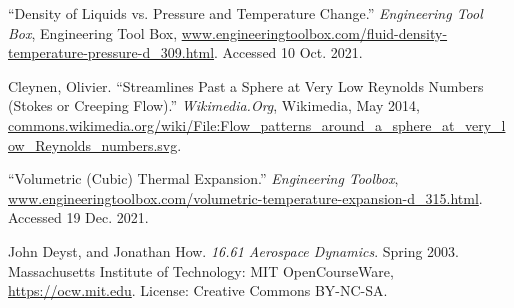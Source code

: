 
\begin{thebibliography}{12}


“Density of Liquids vs. Pressure and Temperature Change.” \emph{Engineering Tool Box}, Engineering Tool Box, \url{www.engineeringtoolbox.com/fluid-density-temperature-pressure-d_309.html}. Accessed 10 Oct. 2021.


Cleynen, Olivier. “Streamlines Past a Sphere at Very Low Reynolds Numbers (Stokes or Creeping Flow).” \emph{Wikimedia.Org}, Wikimedia, May 2014, \url{commons.wikimedia.org/wiki/File:Flow_patterns_around_a_sphere_at_very_low_Reynolds_numbers.svg}.


“Volumetric (Cubic) Thermal Expansion.” \emph{Engineering Toolbox}, \url{www.engineeringtoolbox.com/volumetric-temperature-expansion-d_315.html}. Accessed 19 Dec. 2021.



John Deyst, and Jonathan How. \emph{16.61 Aerospace Dynamics}. Spring 2003. Massachusetts Institute of Technology: MIT OpenCourseWare, \url{https://ocw.mit.edu}. License: Creative Commons BY-NC-SA.





\end{thebibliography}
